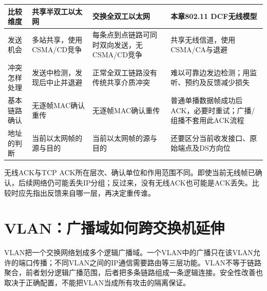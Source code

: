 \begin{wideblock}

\par\medskip\noindent\begin{minipage}{\linewidth}\fontsize{9.3}{12}\selectfont\begin{tabularx}{\linewidth}{@{}YYYY@{}}
\toprule\noalign{}
\begin{minipage}[b]{\linewidth}\raggedright
比较维度
\end{minipage} & \begin{minipage}[b]{\linewidth}\raggedright
共享半双工以太网
\end{minipage} & \begin{minipage}[b]{\linewidth}\raggedright
交换全双工以太网
\end{minipage} & \begin{minipage}[b]{\linewidth}\raggedright
本章802.11 DCF无线模型
\end{minipage} \\
\midrule\noalign{}


发送机会 & 多站共享，使用CSMA/CD竞争 & 每条点到点链路可同时双向发送，无CSMA/CD竞争 & 共享无线信道，使用CSMA/CA与退避 \\
冲突怎样处理 & 发送中检测，发现后中止并退避 & 正常全双工链路没有传统共享介质冲突 & 难以可靠边发边检测；用监听、预约及反馈减少损失 \\
基本链路确认 & 无逐帧MAC确认重传 & 无逐帧MAC确认重传 & 普通单播数据帧成功后ACK，必要时重试；广播/组播不套用此ACK流程 \\
地址的判断 & 当前以太网帧的源与目的 & 当前以太网帧的源与目的 & 还要区分当前收发接口、原始端点及DS方向位 \\
\bottomrule\end{tabularx}
\end{minipage}\par\medskip

\end{wideblock}

无线ACK与TCP ACK所在层次、确认单位和作用范围不同。即使当前无线帧已确认，后续网络仍可能丢失IP分组；反过来，没有无线ACK也可能是ACK丢失。比较时应先指出反馈来自哪一层，再决定重传谁。

\section{VLAN：广播域如何跨交换机延伸}\label{CN03-17}

VLAN把一个交换网络划成多个逻辑广播域。一个VLAN中的广播只在该VLAN允许的端口传播；不同VLAN之间的IP通信需要路由等三层功能。VLAN不等于链路聚合，前者划分逻辑广播范围，后者把多条链路组成一条逻辑连接。安全性改善也取决于正确配置，不能把VLAN当成所有攻击的隔离保证。

